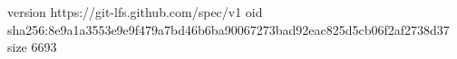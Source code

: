 version https://git-lfs.github.com/spec/v1
oid sha256:8e9a1a3553e9e9f479a7bd46b6ba90067273bad92eac825d5cb06f2af2738d37
size 6693
